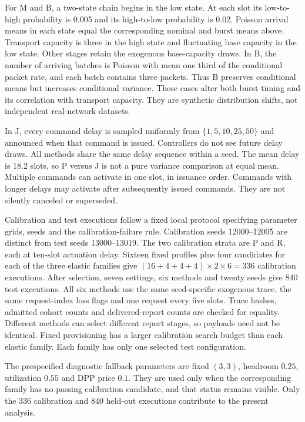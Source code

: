 \documentclass{IEEEoj}
\begin{document}
For M and B, a two-state chain begins in the low state. At each slot its
low-to-high probability is 0.005 and its high-to-low probability is 0.02.
Poisson arrival means in each state equal the corresponding nominal and burst
means above. Transport capacity is three in the high state and fluctuating
base capacity in the low state. Other stages retain the exogenous base-capacity
draws. In B, the number of arriving batches is Poisson with mean one third of
the conditional packet rate, and each batch contains three packets. Thus B
preserves conditional means but increases conditional variance. These cases
alter both burst timing and its correlation with transport capacity. They
are synthetic distribution shifts, not independent real-network datasets.

In J, every command delay is sampled uniformly from $\{1,5,10,25,50\}$ and
announced when that command is issued. Controllers do not see future delay
draws. All methods share the same delay sequence within a seed. The mean delay
is 18.2 slots, so P versus J is not a pure variance comparison at equal mean.
Multiple commands can activate in one slot, in issuance order. Commands with
longer delays may activate after subsequently issued commands. They are not
silently canceled or superseded.


Calibration and test executions follow a fixed local protocol specifying parameter grids, seeds and the calibration-failure rule.
Calibration seeds 12000--12005 are distinct from test seeds 13000--13019.
The two calibration strata are P and R, each at ten-slot actuation delay.
Sixteen fixed profiles plus four candidates for each of the three elastic
families give $(16+4+4+4)\times2\times6=336$ calibration executions.
After selection, seven settings, six methods and twenty seeds give 840 test
executions. All six methods use the same seed-specific exogenous trace, the
same request-index loss flags and one request every five slots. Trace hashes,
admitted cohort counts and delivered-report counts are checked for equality.
Different methods can select different report stages, so payloads need not
be identical. Fixed provisioning has a larger calibration search budget than
each elastic family. Each family has only one selected test configuration.

The prespecified diagnostic fallback parameters are fixed $(3,3)$, headroom
$0.25$, utilization $0.55$ and DPP price $0.1$. They are used only when the
corresponding family has no passing calibration candidate, and that status
remains visible. Only the 336 calibration and 840 held-out executions contribute to the present analysis.
\end{document}

